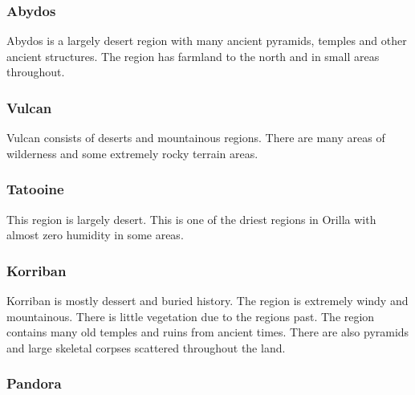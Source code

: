 \subsubsection{Abydos}

Abydos is a largely desert region with many ancient pyramids, temples and other ancient structures. The region has farmland to the north and in small areas throughout.

\subsubsection{Vulcan}

Vulcan consists of deserts and mountainous regions. There are many areas of wilderness and some extremely rocky terrain areas.

\subsubsection{Tatooine}

This region is largely desert. This is one of the driest regions in Orilla with almost zero humidity in some areas.

\subsubsection{Korriban}

Korriban is mostly dessert and buried history. The region is extremely windy and mountainous. There is little vegetation due to the regions past. The region contains many old temples and ruins from ancient times. There are also pyramids and large skeletal corpses scattered throughout the land. 




\subsubsection{Pandora}

